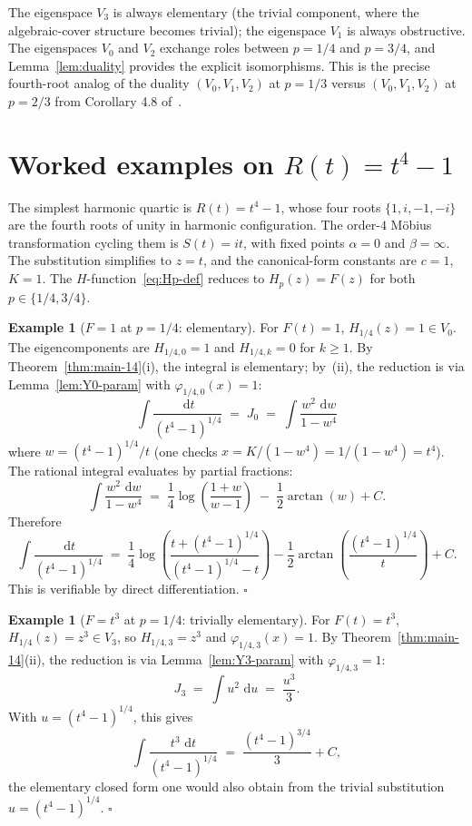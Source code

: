 \documentclass[11pt,a4paper]{article}
\theoremstyle{plain}
\theoremstyle{definition}
\newtheorem{example}[theorem]{Example}
\theoremstyle{remark}
\renewcommand{\d}{\,\mathrm{d}}
\begin{document}
The eigenspace $V_3$ is always elementary (the trivial component, where the algebraic-cover structure becomes trivial); the eigenspace $V_1$ is always obstructive. The eigenspaces $V_0$ and $V_2$ exchange roles between $p = 1/4$ and $p = 3/4$, and Lemma~\ref{lem:duality} provides the explicit isomorphisms. This is the precise fourth-root analog of the duality $(V_0, V_1, V_2)$ at $p = 1/3$ versus $(V_0, V_1, V_2)$ at $p = 2/3$ from Corollary 4.8 of~\cite{GoursatCubic}.

\section{Worked examples on \texorpdfstring{$R(t) = t^4 - 1$}{R(t) = t\^{}4 - 1}}\label{sec:examples}

The simplest harmonic quartic is $R(t) = t^4 - 1$, whose four roots $\{1, i, -1, -i\}$ are the fourth roots of unity in harmonic configuration. The order-$4$ Möbius transformation cycling them is $S(t) = it$, with fixed points $\alpha = 0$ and $\beta = \infty$. The substitution simplifies to $z = t$, and the canonical-form constants are $c = 1$, $K = 1$. The $H$-function~\eqref{eq:Hp-def} reduces to $H_p(z) = F(z)$ for both $p \in \{1/4, 3/4\}$.

\begin{example}[$F = 1$ at $p = 1/4$: elementary]\label{ex:F1-14}
For $F(t) = 1$, $H_{1/4}(z) = 1 \in V_0$. The eigencomponents are $H_{1/4, 0} = 1$ and $H_{1/4, k} = 0$ for $k \geq 1$. By Theorem~\ref{thm:main-14}(i), the integral is elementary; by~(ii), the reduction is via Lemma~\ref{lem:Y0-param} with $\varphi_{1/4, 0}(x) = 1$:
\[
  \int \frac{\d t}{(t^4 - 1)^{1/4}} \;=\; J_0 \;=\; \int \frac{w^2\,\d w}{1 - w^4}
\]
where $w = (t^4-1)^{1/4}/t$ (one checks $x = K/(1-w^4) = 1/(1-w^4) = t^4$). The rational integral evaluates by partial fractions:
\[
  \int \frac{w^2\,\d w}{1 - w^4} \;=\; \frac{1}{4}\log\!\left(\frac{1 + w}{w - 1}\right) \;-\; \frac{1}{2}\arctan(w) + C.
\]
Therefore
\[
  \int \frac{\d t}{(t^4 - 1)^{1/4}} \;=\; \frac{1}{4}\log\!\left(\frac{t + (t^4-1)^{1/4}}{(t^4-1)^{1/4} - t}\right) - \frac{1}{2}\arctan\!\left(\frac{(t^4-1)^{1/4}}{t}\right) + C.
\]
This is verifiable by direct differentiation. \hfill$\square$
\end{example}

\begin{example}[$F = t^3$ at $p = 1/4$: trivially elementary]\label{ex:Ft3-14}
For $F(t) = t^3$, $H_{1/4}(z) = z^3 \in V_3$, so $H_{1/4, 3} = z^3$ and $\varphi_{1/4, 3}(x) = 1$. By Theorem~\ref{thm:main-14}(ii), the reduction is via Lemma~\ref{lem:Y3-param} with $\varphi_{1/4, 3} = 1$:
\[
  J_3 \;=\; \int u^2\,\d u \;=\; \frac{u^3}{3}.
\]
With $u = (t^4 - 1)^{1/4}$, this gives
\[
  \int \frac{t^3\,\d t}{(t^4 - 1)^{1/4}} \;=\; \frac{(t^4 - 1)^{3/4}}{3} + C,
\]
the elementary closed form one would also obtain from the trivial substitution $u = (t^4 - 1)^{1/4}$. \hfill$\square$
\end{example}
\end{document}
